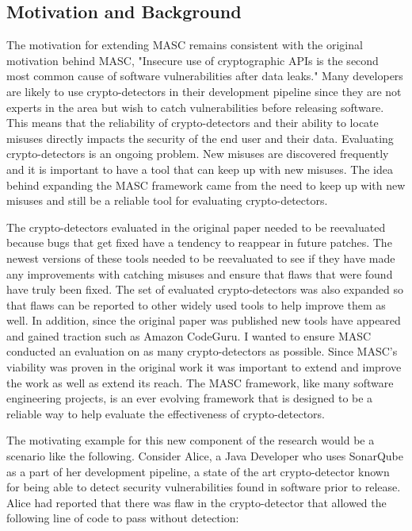 \subsection{Motivation and Background}
\label{ch1:subsec:motivation}

The motivation for extending MASC remains consistent with the original motivation behind MASC, "Insecure use of cryptographic APIs is the second most common cause of software vulnerabilities after data leaks." Many developers are likely to use crypto-detectors in their development pipeline since they are not experts in the area but wish to catch vulnerabilities before releasing software. This means that the reliability of crypto-detectors and their ability to locate misuses directly impacts the security of the end user and their data. Evaluating crypto-detectors is an ongoing problem. New misuses are discovered frequently and it is important to have a tool that can keep up with new misuses. The idea behind expanding the MASC framework came from the need to keep up with new misuses and still be a reliable tool for evaluating crypto-detectors. 

The crypto-detectors evaluated in the original paper needed to be reevaluated because bugs that get fixed have a tendency to reappear in future patches. \cite{bkm+18} The newest versions of these tools needed to be reevaluated to see if they have made any improvements with catching misuses and ensure that flaws that were found have truly been fixed. The set of evaluated crypto-detectors was also expanded so that flaws can be reported to other widely used tools to help improve them as well. In addition, since the original paper was published new tools have appeared and gained traction such as Amazon CodeGuru. I wanted to ensure MASC conducted an evaluation on as many crypto-detectors as possible. Since MASC's viability was proven in the original work it was important to extend and improve the work as well as extend its reach. The MASC framework, like many software engineering projects, is an ever evolving framework that is designed to be a reliable way to help evaluate the effectiveness of crypto-detectors.

The motivating example for this new component of the research would be a scenario like the following. Consider Alice, a Java Developer who uses SonarQube as a part of her development pipeline, a state of the art crypto-detector known for being able to detect security vulnerabilities found in software prior to release. Alice had reported that there was flaw in the crypto-detector that allowed the following line of code to pass without detection:


